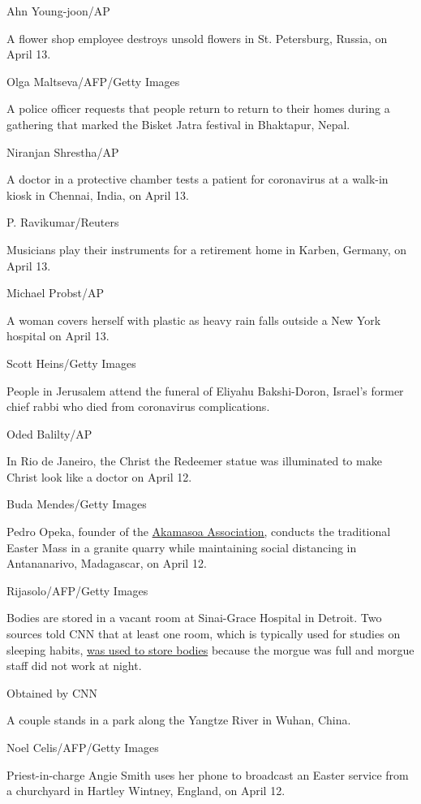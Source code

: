 Ahn Young-joon/AP

A flower shop employee destroys unsold flowers in St. Petersburg,
Russia, on April 13.

Olga Maltseva/AFP/Getty Images

A police officer requests that people return to return to their homes
during a gathering that marked the Bisket Jatra festival in Bhaktapur,
Nepal.

Niranjan Shrestha/AP

A doctor in a protective chamber tests a patient for coronavirus at a
walk-in kiosk in Chennai, India, on April 13.

P. Ravikumar/Reuters

Musicians play their instruments for a retirement home in Karben,
Germany, on April 13.

Michael Probst/AP

A woman covers herself with plastic as heavy rain falls outside a New
York hospital on April 13.

Scott Heins/Getty Images

People in Jerusalem attend the funeral of Eliyahu Bakshi-Doron, Israel's
former chief rabbi who died from coronavirus complications.

Oded Balilty/AP

In Rio de Janeiro, the Christ the Redeemer statue was illuminated to
make Christ look like a doctor on April 12.

Buda Mendes/Getty Images

Pedro Opeka, founder of the
\href{http://www.amicipadrepedro.org/en/akamasoa/}{Akamasoa
Association,} conducts the traditional Easter Mass in a granite quarry
while maintaining social distancing in Antananarivo, Madagascar, on
April 12.

Rijasolo/AFP/Getty Images

Bodies are stored in a vacant room at Sinai-Grace Hospital in Detroit.
Two sources told CNN that at least one room, which is typically used for
studies on sleeping habits,
\href{https://www.cnn.com/2020/04/13/health/detroit-hospital-bodies-coronavirus-trnd/index.html}{was
used to store bodies} because the morgue was full and morgue staff did
not work at night.

Obtained by CNN

A couple stands in a park along the Yangtze River in Wuhan, China.

Noel Celis/AFP/Getty Images

Priest-in-charge Angie Smith uses her phone to broadcast an Easter
service from a churchyard in Hartley Wintney, England, on April 12.

